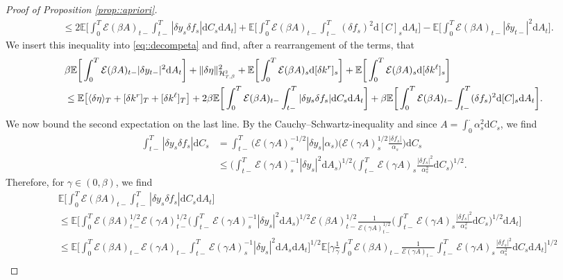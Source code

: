 \documentclass[10pt]{article} %
\newcommand\cE{\mathcal E}
\newcommand\cH{\mathcal H}
\newcommand{\smalltext}[1]{\text{\fontsize{4}{4}\selectfont$#1$}}
\def \E{\mathbb{E}}
\newcommand{\1}{\mathbf{1}}
\def\d{\mathrm{d}}
\begin{document}
\begin{proof}[Proof of Proposition \ref{prop::apriori}]
\begin{align*}
	&\leq 2 \E\bigg[ \int_0^T \cE(\beta A)_{t-} \int_{t-}^T |\delta y_s \delta f_s| \d C_s\d A_t \bigg] + \E\bigg[ \int_0^T \cE(\beta A)_{t-} \int_{t-}^T (\delta f_s)^2 \d [C]_s \d A_t \bigg]  - \E\bigg[ \int_0^T \cE(\beta A)_{t-}|\delta y_{t-}|^2 \d A_t \bigg].
\end{align*}
We insert this inequality into \eqref{eq::decompeta} and find, after a rearrangement of the terms, that
\begin{align}\label{eq::inequality_norms_1}
	&\beta \E\bigg[ \int_0^T \cE(\beta A)_{t-}|\delta y_{t-}|^2 \d A_t \bigg] + \|\delta\eta\|^2_{\cH^\smalltext{2}_{\smalltext{T}\smalltext{,}\beta}} + \E\bigg[\int_0^T \cE(\beta A)_s \d [\delta k^r]_s\bigg] + \E\bigg[\int_0^T \cE(\beta A)_s \d [\delta k^\ell]_s\bigg] \nonumber\\
	&\leq \E\big[ \langle \delta\eta \rangle_T + [\delta k^r]_T + [\delta k^\ell]_T \big] + 2\beta \E\bigg[ \int_0^T \cE(\beta A)_{t-} \int_{t-}^T |\delta y_s \delta f_s| \d C_s\d A_t \bigg] + \beta \E\bigg[ \int_0^T \cE(\beta A)_{t-} \int_{t-}^T (\delta f_s)^2 \d [C]_s \d A_t \bigg].
\end{align}
We now bound the second expectation on the last line. By the Cauchy--Schwartz-inequality and since $A = \int_0^\cdot \alpha^2_s \d C_s$, we find
\begin{align*}
	\int_{t-}^T |\delta y_s \delta f_s|\d C_s 
	&= \int_{t-}^T \big(\cE(\gamma A)^{-1/2}_s|\delta y_s|\alpha_s\big) \bigg(\cE(\gamma A)^{1/2}_s\frac{|\delta f_s|}{\alpha_s}\bigg)\d C_s \\
	&\leq \bigg(\int_{t-}^T \cE(\gamma A)^{-1}_s |\delta y_s|^2 \d A_s\bigg)^{1/2}\bigg(\int_{t-}^T \cE(\gamma A)_s\frac{|\delta f_s|^2}{\alpha^2_s}\d C_s\bigg)^{1/2}.
\end{align*}
Therefore, for $\gamma \in (0,\beta)$, we find
\begin{align}\label{eq6}
	&\E\bigg[ \int_0^T \cE(\beta A)_{t-}\int_{t-}^T |\delta y_s \delta f_s|\d C_s \d A_t \bigg] \nonumber \\
	&\leq \E\bigg[ \int_0^T \cE(\beta A)^{1/2}_{t-}\cE(\gamma A)^{1/2}_{t-}\bigg(\int_{t-}^T \cE(\gamma A)^{-1}_s |\delta y_s|^2 \d A_s\bigg)^{1/2} \cE(\beta A)^{1/2}_{t-}\frac{1}{\cE(\gamma A)^{1/2}_{t-}}\bigg(\int_{t-}^T \cE(\gamma A)_s\frac{|\delta f_s|^2}{\alpha^2_s}\d C_s\bigg)^{1/2} \d A_t \bigg] \nonumber \\
	& \leq \E\bigg[ \int_0^T \cE(\beta A)_{t-}\cE(\gamma A)_{t-}\int_{t-}^T \cE(\gamma A)^{-1}_s |\delta y_s|^2 \d A_s \d A_t \bigg]^{1/2} \E\bigg[ \gamma \frac{1}{\gamma} \int_0^T\cE(\beta A)_{t-}\frac{1}{\cE(\gamma A)_{t-}}\int_{t-}^T \cE(\gamma A)_s\frac{|\delta f_s|^2}{\alpha^2_s}\d C_s \d A_t \bigg]^{1/2} \nonumber\\

\end{align}
\end{proof}
\end{document}
